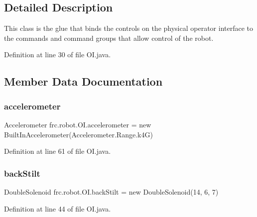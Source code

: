 \subsection{Detailed Description}
This class is the glue that binds the controls on the physical operator interface to the commands and command groups that allow control of the robot. 

Definition at line 30 of file O\+I.\+java.



\subsection{Member Data Documentation}
\mbox{\label{classfrc_1_1robot_1_1_o_i_a57e609e018f3013d5beb8bffa5771df0}} 
\subsubsection{\texorpdfstring{accelerometer}{accelerometer}}
{\footnotesize\ttfamily Accelerometer frc.\+robot.\+O\+I.\+accelerometer = new Built\+In\+Accelerometer(Accelerometer.\+Range.\+k4G)\hspace{0.3cm}{\ttfamily [static]}}



Definition at line 61 of file O\+I.\+java.

\mbox{\label{classfrc_1_1robot_1_1_o_i_a89667abb08d7721a47088f0218fd5afa}} 
\subsubsection{\texorpdfstring{back\+Stilt}{backStilt}}
{\footnotesize\ttfamily Double\+Solenoid frc.\+robot.\+O\+I.\+back\+Stilt = new Double\+Solenoid(14, 6, 7)\hspace{0.3cm}{\ttfamily [static]}}



Definition at line 44 of file O\+I.\+java.

\mbox{\label{classfrc_1_1robot_1_1_o_i_a951d7ff102fca8319e5a9401a0f2214b}} 

